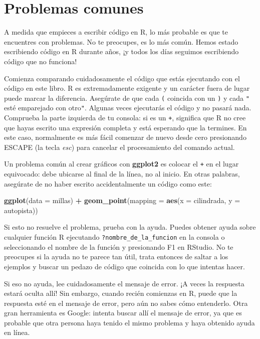 \documentclass[11pt,oneside]{report}
\newenvironment{Shaded}{\begin{snugshade}}{\end{snugshade}}
\newcommand{\DataTypeTok}[1]{\textcolor[rgb]{0.13,0.29,0.53}{#1}}
\newcommand{\KeywordTok}[1]{\textcolor[rgb]{0.13,0.29,0.53}{\textbf{#1}}}
\newcommand{\NormalTok}[1]{#1}
\newcommand{\OperatorTok}[1]{\textcolor[rgb]{0.81,0.36,0.00}{\textbf{#1}}}
\newcommand{\StringTok}[1]{\textcolor[rgb]{0.31,0.60,0.02}{#1}}
\begin{document}
\hypertarget{problemas-comunes}{%
\section{Problemas comunes}\label{problemas-comunes}}

A medida que empieces a escribir código en R, lo más probable es que te
encuentres con problemas. No te preocupes, es lo más común. Hemos estado
escribiendo código en R durante años, ¡y todos los días seguimos
escribiendo código que no funciona!

Comienza comparando cuidadosamente el código que estás ejecutando con el
código en este libro. R es extremadamente exigente y un carácter fuera
de lugar puede marcar la diferencia. Asegúrate de que cada \texttt{(}
coincida con un \texttt{)} y cada \texttt{"} esté emparejado con
otro\texttt{"}. Algunas veces ejecutarás el código y no pasará nada.
Comprueba la parte izquierda de tu consola: si es un \texttt{+},
significa que R no cree que hayas escrito una expresión completa y está
esperando que la termines. En este caso, normalmente es más fácil
comenzar de nuevo desde cero presionando ESCAPE (la tecla \emph{esc})
para cancelar el procesamiento del comando actual.

Un problema común al crear gráficos con \textbf{ggplot2} es colocar el
\texttt{+} en el lugar equivocado: debe ubicarse al final de la línea,
no al inicio. En otras palabras, asegúrate de no haber escrito
accidentalmente un código como este:

\begin{Shaded}
\begin{Highlighting}[]
\KeywordTok{ggplot}\NormalTok{(}\DataTypeTok{data =}\NormalTok{ millas)}
\OperatorTok{+}\StringTok{ }\KeywordTok{geom_point}\NormalTok{(}\DataTypeTok{mapping =} \KeywordTok{aes}\NormalTok{(}\DataTypeTok{x =}\NormalTok{ cilindrada, }\DataTypeTok{y =}\NormalTok{ autopista))}
\end{Highlighting}
\end{Shaded}

Si esto no resuelve el problema, prueba con la ayuda. Puedes obtener
ayuda sobre cualquier función R ejecutando
\texttt{?nombre\_de\_la\_funcion} en la consola o seleccionando el
nombre de la función y presionando F1 en RStudio. No te preocupes si la
ayuda no te parece tan útil, trata entonces de saltar a los ejemplos y
buscar un pedazo de código que coincida con lo que intentas hacer.

Si eso no ayuda, lee cuidadosamente el mensaje de error. ¡A veces la
respuesta estará oculta allí! Sin embargo, cuando recién comienzas en R,
puede que la respuesta esté en el mensaje de error, pero aún no sabes
cómo entenderlo. Otra gran herramienta es Google: intenta buscar allí el
mensaje de error, ya que es probable que otra persona haya tenido el
mismo problema y haya obtenido ayuda en línea.
\end{document}
